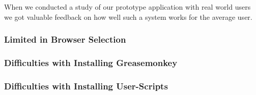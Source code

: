 When we conducted a study of our prototype application with real world users
we got valuable feedback on how well such a system works for the average user.


\subsubsection{Limited in Browser Selection}

\subsubsection{Difficulties with Installing Greasemonkey}

\subsubsection{Difficulties with Installing User-Scripts}
